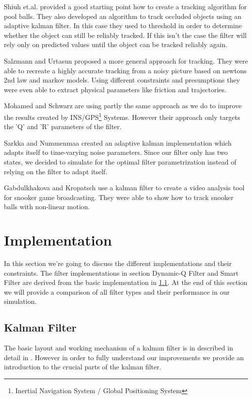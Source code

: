 \documentclass[notitlepage, a4paper, 11pt]{scrartcl}
\begin{document}
\begin{multicols}{2}
Shiuh et.al. \cite{shiuh} provided a good starting point how to create a tracking algorithm for pool balls. They also developed an algorithm to track occluded objects using an adaptive kalman filter.
In this case they used to threshold in order to determine whether the object can still be reliably tracked. If this isn't the case the filter will rely only on predicted values until the object can be tracked reliably again.

Salzmann and Urtasun \cite{salzmann} proposed a more general approach for tracking. 
They were able to recreate a highly accurate tracking from a noisy picture based on newtons 2nd law and markov models.
Using different constraints and presumptions they were even able to extract physical parameters like friction and trajectories.

Mohamed and Schwarz \cite{schwarz} are using partly the same approach as we do to improve the results created by INS/GPS\footnote{Inertial Navigation System / Global Positioning System} Systems.
However their approach only targets the 'Q' and 'R' parameters of the filter.

Sarkka and Nummenmaa \cite{sarkka} created an adaptive kalman implementation which adapts itself to time-varying noise parameters. 
Since our filter only has two states, we decided to simulate for the optimal filter parametrization instead of relying on the filter to adapt itself.

Gabdulkhakova and Kropatsch \cite{kropatsch} use a kalman filter to create a video analysis tool for snooker game broadcasting.
They were able to show how to track snooker balls with non-linear motion.

\section{Implementation} \label{implementation}
In this section we're going to discuss the different implementations and their constraints. The filter implementations in section Dynamic-Q Filter and Smart Filter are derived from
the basic implementation in \cref{kalman-basic}. At the end of this section we will provide a comparison of all filter types and their performance in our simulation.

\subsection{Kalman Filter} \label{kalman-basic}

The basic layout and working mechanism of a kalman filter is in described in detail in \cite{kalman}. 
However in order to fully understand our improvements we provide an introduction to the crucial parts of the kalman filter.


\end{multicols}
\end{document}
